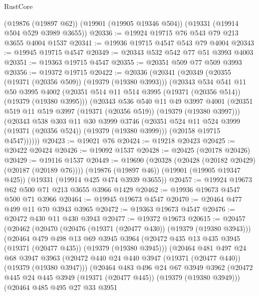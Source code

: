 \begin{lexlean}{RustCore}
\begin{coremodule}
    (@19876 (@19897 @62))
    (@19901 (@19905 @19346 @504))
    (@19331 (@19914 @504 @529 @3989 @3655))
@20336 := @19924 @19715 @76 @543 @79 @213 @3655 @4004 @1537
@20341 := @19936 @19715 @4547 @543 @79 @4004
@20343 := @19945 @19715 @4547
@20349 := @20343 @532 @542 @77 @51 @3993 @4003
@20351 := @19363 @19715 @4547
@20355 := @20351 @509 @77 @509 @3993
@20356 := @19372 @19715
@20422 := @20336
    (@20341
      (@20349
        (@20355 (@19371 (@20356 @509)) (@19379 (@19380 @3993)))
        (@20343
          @534
          @541
          @11
          @50
          @3995
          @4002
          (@20351 @514 @11 @514 @3995 (@19371 (@20356 @514)) (@19379 (@19380 @3995)))
          (@20343
            @536
            @540
            @11
            @49
            @3997
            @4001
            (@20351 @519 @11 @519 @3997 (@19371 (@20356 @519)) (@19379 (@19380 @3997)))
            (@20343
              @538
              @303
              @11
              @30
              @3999
              @3746
              (@20351 @524 @11 @524 @3999 (@19371 (@20356 @524)) (@19379 (@19380 @3999)))
              (@20158 @19715 @4547))))))
@20423 := @19021 @76
@20424 := @19218 @20423
@20425 := @20422 @20424
@20426 := @19092 @1537
@20428 := @20425 (@20178 @20426)
@20429 := @19116 @1537
@20449 := @19690
    (@20328 (@20428 (@20182 @20429) (@20187 (@20189 @76))))
    (@19876 (@19897 @46))
    (@19901 (@19905 @19347 @425))
    (@19331 (@19914 @425 @474 @3939 @3655))
@20457 := @19924 @19673 @62 @500 @71 @213 @3655 @3966 @1429
@20462 := @19936 @19673 @4547 @500 @71 @3966
@20464 := @19945 @19673 @4547
@20470 := @20464 @477 @499 @11 @70 @3943 @3965
@20472 := @19363 @19673 @4547
@20476 := @20472 @430 @11 @430 @3943
@20477 := @19372 @19673
@20615 := @20457
    (@20462
      (@20470
        (@20476 (@19371 (@20477 @430)) (@19379 (@19380 @3943)))
        (@20464
          @479
          @498
          @13
          @69
          @3945
          @3964
          (@20472 @435 @13 @435 @3945 (@19371 (@20477 @435)) (@19379 (@19380 @3945)))
          (@20464
            @481
            @497
            @24
            @68
            @3947
            @3963
            (@20472 @440 @24 @440 @3947 (@19371 (@20477 @440)) (@19379 (@19380 @3947)))
            (@20464
              @483
              @496
              @24
              @67
              @3949
              @3962
              (@20472 @445 @24 @445 @3949 (@19371 (@20477 @445)) (@19379 (@19380 @3949)))
              (@20464
                @485
                @495
                @27
                @33
                @3951

\end{coremodule}
\end{lexlean}
